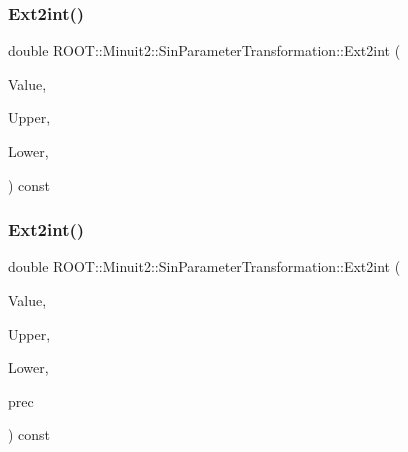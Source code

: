 \subsubsection{\texorpdfstring{Ext2int()}{Ext2int()}\hspace{0.1cm}{\footnotesize\ttfamily [2/3]}}
{\footnotesize\ttfamily double R\+O\+O\+T\+::\+Minuit2\+::\+Sin\+Parameter\+Transformation\+::\+Ext2int (\begin{DoxyParamCaption}\item[{double}]{Value,  }\item[{double}]{Upper,  }\item[{double}]{Lower,  }\item[{const \mbox{\hyperlink{classROOT_1_1Minuit2_1_1MnMachinePrecision}{Mn\+Machine\+Precision}} \&}]{ }\end{DoxyParamCaption}) const}

\mbox{\label{classROOT_1_1Minuit2_1_1SinParameterTransformation_a5a98af7b966742b4d3c90ab6d6bbeb5a}} 
\subsubsection{\texorpdfstring{Ext2int()}{Ext2int()}\hspace{0.1cm}{\footnotesize\ttfamily [3/3]}}
{\footnotesize\ttfamily double R\+O\+O\+T\+::\+Minuit2\+::\+Sin\+Parameter\+Transformation\+::\+Ext2int (\begin{DoxyParamCaption}\item[{double}]{Value,  }\item[{double}]{Upper,  }\item[{double}]{Lower,  }\item[{const \mbox{\hyperlink{classROOT_1_1Minuit2_1_1MnMachinePrecision}{Mn\+Machine\+Precision}} \&}]{prec }\end{DoxyParamCaption}) const}

